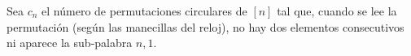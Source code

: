Sea $c_n$ el número de permutaciones circulares de $[n]$ tal que, cuando se lee la permutación (según las manecillas del reloj), no hay dos elementos consecutivos ni aparece la sub‑palabra $n,1$.
